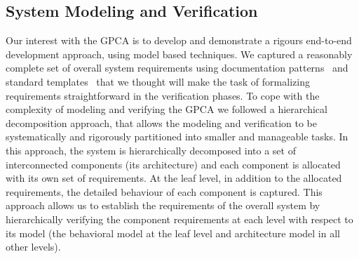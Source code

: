 \subsection {System Modeling and Verification}

Our interest with the GPCA is to develop and demonstrate a rigours end-to-end development approach, using model based techniques. We captured a reasonably complete set of overall system requirements using documentation patterns~\cite{mavin2009easy} and standard templates~\cite{IEEEFormats} that we thought will make the task of formalizing requirements straightforward in the verification phases. To cope with the complexity of modeling and verifying the GPCA we followed a hierarchical decomposition approach, that allows the modeling and verification to be systematically and rigorously partitioned into smaller and manageable tasks. In this approach, the system is hierarchically decomposed into a set of interconnected components (its architecture) and each component is allocated with its own set of requirements. At the leaf level, in addition to the allocated requirements, the detailed behaviour of each component is captured. This approach allows us to establish the requirements of the overall system by hierarchically verifying the component requirements at each level with respect to its model (the behavioral model at the leaf level and architecture model in all other levels).

